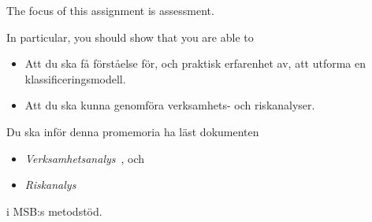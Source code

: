 The focus of this assignment is assessment.

In particular, you should show that you are able to
\begin{itemize}
\item Att du ska få förståelse för, och praktisk erfarenhet av, att utforma en 
  klassificeringsmodell.
\item Att du ska kunna genomföra verksamhets- och riskanalyser.
\end{itemize}

Du ska inför denna promemoria ha läst dokumenten
\begin{itemize}
  \item \emph{Verksamhetsanalys}~\cite{MSB2011v}, och
  \item \emph{Riskanalys}~\cite{MSB2011r}
\end{itemize}
i MSB:s metodstöd.
